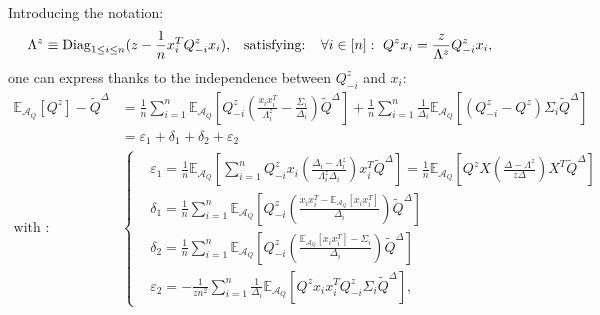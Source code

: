 \documentclass[a4papaer, titlepage]{book}
\begin{document}
Introducing the notation:
\begin{align*}
   \Lambda^z \equiv \operatorname{Diag}_{1\leq i \leq n} (z - \frac1nx_i^TQ_{-i}^zx_i),&
   &\text{satisfying: } \ \ \forall i \in [n]: \ Q^z x_i = \frac{z}{\Lambda^z}Q_{-i}^z x_i,
 \end{align*} 
one can express thanks to the independence between $Q^z_{-i}$ and $x_i$:
\begin{align}\label{eq:definition_epsilon_1_2}
\mathbb{E}_{\mathcal A_Q} \left[Q^z\right] - \tilde Q^\Delta 
    &= \frac{1}{n}\sum_{i=1}^n  \mathbb{E}_{\mathcal A_Q}\left[Q^z_{-i} \left(\frac{x_ix_i^T}{\Lambda_i^z} - \frac{\Sigma_i}{\Delta_i}\right)\tilde{Q}^\Delta\right] 
    + \frac{1}{n}\sum_{i=1}^n \frac{1}{\Delta_i}\mathbb{E}_{\mathcal A_Q}\left[(Q_{-i}^z - Q^z) \Sigma_i \tilde Q^\Delta\right]\nonumber\\
  &= \varepsilon_1 + \delta_1 + \delta_2 +\varepsilon_2 \\
  \text{with :} \ \ \ &\left\{
  \begin{aligned}
    &\varepsilon_1 = \frac{1}{n} \mathbb{E}_{\mathcal A_Q}\left[\sum_{i = 1}^nQ^z_{-i}x_i \left(\frac{\Delta_i - \Lambda_i^z}{\Lambda_i^z\Delta_i}\right)x_i^T \tilde{Q}^\Delta \right] = \frac{1}{n} \mathbb{E}_{\mathcal A_Q}\left[Q^zX \left(\frac{\Delta - \Lambda^z}{z\Delta}\right)X^T \tilde{Q}^\Delta \right] \\
    &\delta_1 = \frac{1}{n}\sum_{i=1}^n \mathbb{E}_{\mathcal A_Q}\left[Q^z_{-i} \left(\frac{x_ix_i^T - \mathbb{E}_{\mathcal A_Q}[x_ix_i^T] }{\Delta_i}\right)\tilde{Q}^\Delta \right] \\
    &\delta_2 = \frac{1}{n}\sum_{i=1}^n \mathbb{E}_{\mathcal A_Q}\left[Q^z_{-i} \left(\frac{\mathbb{E}_{\mathcal A_Q}[x_ix_i^T] - \Sigma_i}{\Delta_i}\right)\tilde{Q}^\Delta \right] \\
    & \varepsilon_2 =  -\frac{1}{zn^2} \sum_{i=1}^n \frac{1}{\Delta_i}\mathbb{E}_{\mathcal A_Q}\left[Q^zx_i x_i^TQ_{-i}^z\Sigma_i\tilde{Q}^\Delta\right],
  \end{aligned}
  \right. \nonumber
\end{align}
\end{document}
